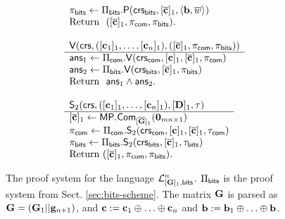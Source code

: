 \begin{figure}
\begin{\algSize}
$$\begin{array}{l}
\begin{array}{l}
\pi_{\mathsf{bits}} \gets \Pi_{\mathsf{bits}}.\mathsf{P}(\mathsf{crs}_{\mathsf{bits}},[\overline{\mathbf{c}}]_1,\langle \mathbf{b},\overline{w}\rangle)\\
\text{Return } \  ([\overline{\mathbf{c}}]_1,\pi_{\mathsf{com}},\pi_{\mathsf{bits}}). \\
\\
\end{array}\\
\begin{array}{l}
{\mathsf{V}(\mathsf{crs},([\mathbf{c}_1]_1,\ldots,[\mathbf{c}_n]_1),([\overline{\mathbf{c}}]_1,\pi_{\mathsf{com}},\pi_{\mathsf{bits}}))}\\
\hline
\mathsf{ans}_1 \gets \Pi_{\mathsf{com}}.\mathsf{V}(\mathsf{crs}_{\mathsf{com}},[\mathbf{c}]_1,[\overline{\mathbf{c}}]_1,\pi_{\mathsf{com}})\\
\mathsf{ans}_2 \gets \Pi_{\mathsf{bits}}.\mathsf{V}(\mathsf{crs}_{\mathsf{bits}},[\overline{\mathbf{c}}]_1,\pi_{\mathsf{bits}})\\
\text{Return } \ \mathsf{ans}_1\wedge\mathsf{ans}_2.
\\
\\
\end{array}
\\
\begin{array}{l}
{\mathsf{S}_2(\mathsf{crs},([\mathbf{c}_1]_1,\ldots,[\mathbf{c}_n]_1),[\mathbf{{D}}]_1,\tau)}\\
\hline
{[\overline{\mathbf{c}}]_1 \gets \mathsf{MP}.\mathsf{Com}_{[\overline{\mathbf{{G}}}]_1}(\mathbf{0}_{mn\times 1})}\\
\pi_{\mathsf{com}}\gets \Pi_{\mathsf{com}}.\mathsf{S}_2(\mathsf{crs}_{\mathsf{com}},[\mathbf{c}]_1,[\overline{\mathbf{c}}]_1,\tau_{\mathsf{com}})\\
\pi_{\mathsf{bits}} \gets \Pi_{\mathsf{bits}}.\mathsf{S}_2(\mathsf{crs}_{\mathsf{bits}},[\overline{\mathbf{c}}]_1,\tau_{\mathsf{bits}})\\
\text{Return }  ([\overline{\mathbf{c}}]_1,\pi_{\mathsf{com}}, \pi_{\mathsf{bits}}).
\end{array}
\end{array}$$
\end{\algSize}
\caption{The proof system for the language $\mathcal{L}_{[\mathbf{{G}}]_1,\mathsf{bits}}^n$. $\Pi_{\mathsf{bits}}$ is the proof system from Sect. \ref{sec:bits-scheme}. The matrix $\mathbf{{G}}$ is parsed as $\mathbf{G}=(\mathbf{G}_1||\mathbf{g}_{n+1})$, and $\mathbf{c}:=\mathbf{c}_1\oplus\ldots\oplus\mathbf{c}_n$ and $\mathbf{b}:=\mathbf{b}_1\oplus\ldots\oplus\mathbf{b}$.
\label{fig:bitsn}
}
\end{figure}
